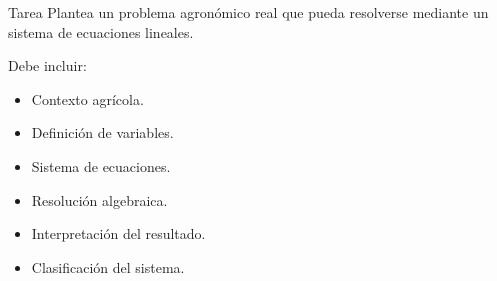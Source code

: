 \documentclass{beamer}
\begin{document}
	\begin{frame}{Tarea}
		Plantea un problema agronómico real que pueda resolverse mediante un sistema de ecuaciones lineales.
		
		\bigskip
		
		Debe incluir:
		
		\begin{itemize}
			\item Contexto agrícola.
			\item Definición de variables.
			\item Sistema de ecuaciones.
			\item Resolución algebraica.
			\item Interpretación del resultado.
			\item Clasificación del sistema.
		\end{itemize}
	\end{frame}
	
\end{document}
